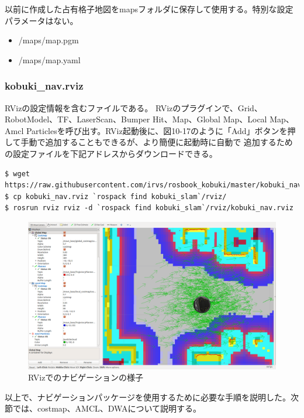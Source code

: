 以前に作成した占有格子地図をmapsフォルダに保存して使用する。特別な設定パラメータはない。

\begin{itemize}
\item /maps/map.pgm
\item /maps/map.yaml
\end{itemize}

\subsubsection{kobuki\_nav.rviz}

RVizの設定情報を含むファイルである。 RVizのプラグインで、Grid、RobotModel、TF、LaserScan、Bumper Hit、Map、Global Map、Local Map、Amcl Particlesを呼び出す。RViz起動後に、図10-17のように「Add」ボタンを押して手動で追加することもできるが、より簡便に起動時に自動で  追加するための設定ファイルを下記アドレスからダウンロードできる。

\begin{lstlisting}[language=ROS]
$ wget https://raw.githubusercontent.com/irvs/rosbook_kobuki/master/kobuki_navigation/rviz/kobuki_nav.rviz
$ cp kobuki_nav.rviz `rospack find kobuki_slam`/rviz/
$ rosrun rviz rviz -d `rospack find kobuki_slam`/rviz/kobuki_nav.rviz
\end{lstlisting}

\begin{figure}[ht]
  \centering
  \includegraphics[width=\columnwidth]{pictures/chapter10/pic_10_17.png}
  \caption{RVizでのナビゲーションの様子}
\end{figure}

以上で、ナビゲーションパッケージを使用するために必要な手順を説明した。次節では、costmap、AMCL、DWAについて説明する。

